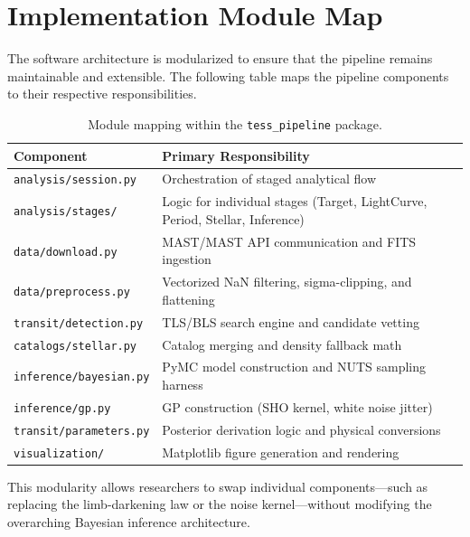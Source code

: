 \documentclass[12pt,a4paper,oneside]{report}
\newcommand{\code}[1]{\texttt{\small #1}}
\begin{document}
\section{Implementation Module Map}
The software architecture is modularized to ensure that the pipeline remains maintainable and extensible. The following table maps the pipeline components to their respective responsibilities.

\begin{longtable}{p{}p{}}
\caption{Module mapping within the \code{tess\_pipeline} package.}\label{tab:files}\\
\toprule
Component & Primary Responsibility\\
\midrule
\code{analysis/session.py} & Orchestration of staged analytical flow \\
\code{analysis/stages/} & Logic for individual stages (Target, LightCurve, Period, Stellar, Inference) \\
\code{data/download.py} & MAST/MAST API communication and FITS ingestion \\
\code{data/preprocess.py} & Vectorized NaN filtering, sigma-clipping, and flattening \\
\code{transit/detection.py} & TLS/BLS search engine and candidate vetting \\
\code{catalogs/stellar.py} & Catalog merging and density fallback math \\
\code{inference/bayesian.py} & PyMC model construction and NUTS sampling harness \\
\code{inference/gp.py} & GP construction (SHO kernel, white noise jitter) \\
\code{transit/parameters.py} & Posterior derivation logic and physical conversions \\
\code{visualization/} & Matplotlib figure generation and rendering \\
\bottomrule
\end{longtable}

This modularity allows researchers to swap individual components—such as replacing the limb-darkening law or the noise kernel—without modifying the overarching Bayesian inference architecture.




\end{document}
